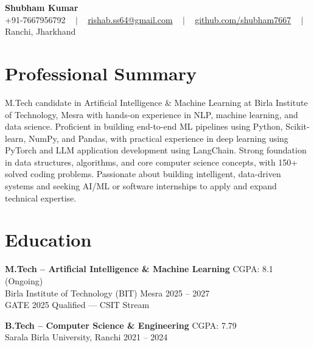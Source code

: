 \documentclass[10.5pt,a4paper]{article}
\begin{document}
\begin{center}
    {\Huge \bfseries Shubham Kumar}\\[6pt]
    \small
    +91-7667956792 ~ $\vert$ ~
    \href{mailto:rishab.ss64@gmail.com}{rishab.ss64@gmail.com} ~ $\vert$ ~
    \href{https://github.com/shubham7667}{github.com/shubham7667} ~ $\vert$ ~
    Ranchi, Jharkhand
\end{center}

\vspace{2pt}

\section*{Professional Summary}
M.Tech candidate in Artificial Intelligence & Machine Learning at Birla Institute of Technology, Mesra with hands-on experience in NLP, machine learning, and data science. Proficient in building end-to-end ML pipelines using Python, Scikit-learn, NumPy, and Pandas, with practical experience in deep learning using PyTorch and LLM application development using LangChain. Strong foundation in data structures, algorithms, and core computer science concepts, with 150+ solved coding problems. Passionate about building intelligent, data-driven systems and seeking AI/ML or software internships to apply and expand technical expertise.


\section*{Education}

\textbf{M.Tech -- Artificial Intelligence \& Machine Learning} \hfill CGPA: 8.1 (Ongoing) \\
Birla Institute of Technology (BIT) Mesra \hfill 2025 -- 2027 \\
GATE 2025 Qualified --- CSIT Stream

\vspace{2pt}

\textbf{B.Tech -- Computer Science \& Engineering} \hfill CGPA: 7.79 \\
Sarala Birla University, Ranchi \hfill 2021 -- 2024

\end{document}
